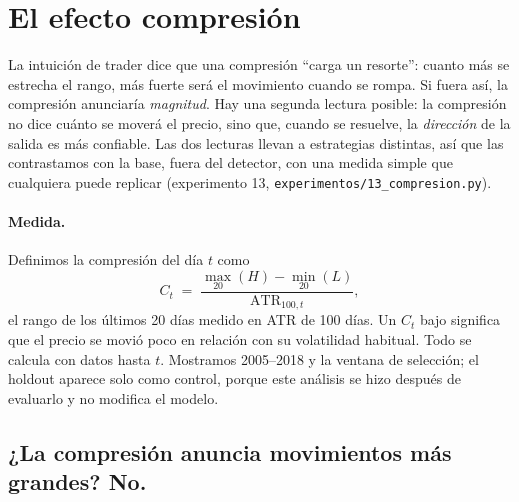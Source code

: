 \documentclass[10pt,a4paper]{article}
\newcommand{\ruta}[1]{\nolinkurl{#1}}
\begin{document}
\section{El efecto compresión}\label{sec:compresion}

La intuición de trader dice que una compresión ``carga un resorte'': cuanto más se
estrecha el rango, más fuerte será el movimiento cuando se rompa. Si fuera así, la
compresión anunciaría \emph{magnitud}. Hay una segunda lectura posible: la
compresión no dice cuánto se moverá el precio, sino que, cuando se resuelve, la
\emph{dirección} de la salida es más confiable. Las dos lecturas llevan a
estrategias distintas, así que las contrastamos con la base, fuera del detector,
con una medida simple que cualquiera puede replicar (experimento 13,
\ruta{experimentos/13_compresion.py}).

\paragraph{Medida.} Definimos la compresión del día $t$ como
\begin{equation}
  C_t \;=\; \frac{\max_{20}(H) - \min_{20}(L)}{\text{ATR}_{100,t}},
\end{equation}
el rango de los últimos 20 días medido en ATR de 100 días. Un $C_t$ bajo significa
que el precio se movió poco en relación con su volatilidad habitual. Todo se
calcula con datos hasta $t$. Mostramos 2005--2018 y la ventana de selección; el
holdout aparece solo como control, porque este análisis se hizo después de
evaluarlo y no modifica el modelo.

\subsection{¿La compresión anuncia movimientos más grandes? No.}
\end{document}
